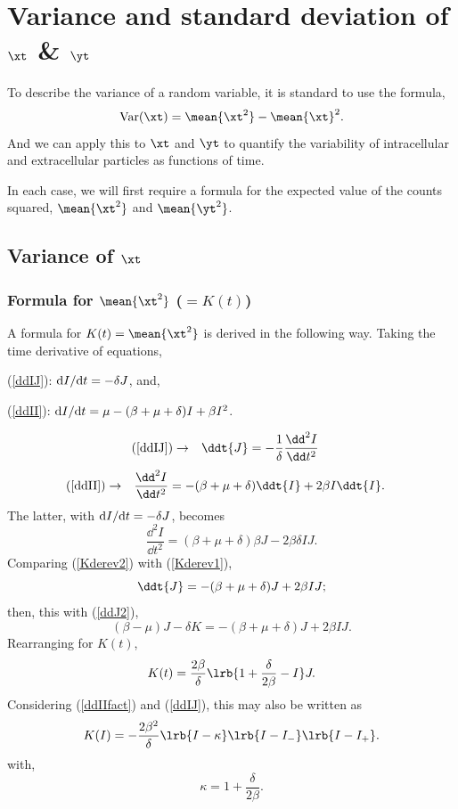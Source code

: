 \section{Variance and standard deviation of $\xt$ \& $\yt$}

To describe the variance of a random variable, it is standard to use the formula, 
\begin{equation*}
\text{Var}(\xt) = \mean{\xt^2} - \mean{\xt}^2.
\end{equation*}
And we can apply this to $\xt$ and $\yt$ to quantify the variability of intracellular and extracellular particles as functions of time. 

In each case, we will first require a formula for the expected value of the counts squared,  $\mean{\xt^2}$ and $\mean{\yt^2}$.



\subsection{Variance of $\xt$}

\subsubsection{Formula for $\mean{\xt^2}$ ($ = K(t)$)}

A formula for $K(t) = \mean{\xt^2}$ is derived in the following way. Taking the time derivative of equations,

 (\ref{ddIJ}): ${\rm d}I/{\rm d}t = -\delta J$, and, 
 
 (\ref{ddII}): ${\rm d}I/{\rm d}t = \mu - (\beta + \mu + \delta) I + \beta I^2$.

\begin{align}
\label{Kderev1}
\text{(\ref{ddIJ})}\to&&\ddt{J} = -\frac{1}{\delta}\frac{\dd^2 I}{\dd t^2}&&
\end{align}
\begin{align*}
\text{(\ref{ddII})}\to&& \frac{\dd^2 I}{\dd t^2} = -(\beta + \mu + \delta) \ddt{I} + 2\beta I \ddt{I}.&&
\end{align*}
The latter, with ${\rm d}I/{\rm d}t = -\delta J$, becomes
\begin{equation}
\label{Kderev2}
\frac{\dd^2 I}{\dd t^2} = (\beta + \mu + \delta)\beta J- 2\beta \delta I J.
\end{equation}
Comparing (\ref{Kderev2}) with (\ref{Kderev1}),
\begin{equation*}
\ddt{J} = -(\beta + \mu + \delta) J + 2\beta I J;
\end{equation*}
then, this with (\ref{ddJ2}),
$$(\beta - \mu) J - \delta K = -(\beta + \mu + \delta) J + 2\beta I J.$$
Rearranging for $K(t)$,
\begin{equation}
\label{Kt1}
K(t) = \frac{2\beta}{\delta}\lrb{1+\frac{\delta}{2\beta} - I}J.
\end{equation}
Considering (\ref{ddIIfact}) and (\ref{ddIJ}), this may also be written as
\begin{equation}
\label{KtI}
K(I) = -\frac{2\beta^2}{\delta}\lrb{I-\kappa}\lrb{I-I_-}\lrb{I-I_+}.
\end{equation}
with,
$$\kappa = 1+\frac{\delta}{2\beta}.$$



